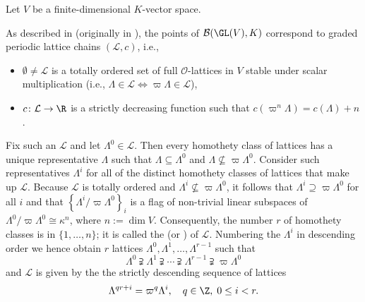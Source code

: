 \documentclass[a4paper]{scrartcl} %
\numberwithin{equation}{section}
\begin{document}
\begin{Remark}\label{gl-building}
  Let $V$ be a finite-dimensional $K$-vector space.
  
  As described in \cite[.9]{kisin-pappas} (originally in \cite{zbMATH03900941}), the points of $\mathcal{B}(\GL(V),K)$ correspond to graded periodic lattice chains $(\mathcal{L},c)$, i.e.,
\begin{itemize}
\item $\emptyset\ne\mathcal{L}$ is a totally ordered set of full $\mathcal{O}$-lattices in $V$ stable under scalar multiplication (i.e., $\Lambda\in\mathcal{L} \iff \varpi\Lambda\in\mathcal{L}$),
\item $c\colon \mathcal{L}\to\R$ is a strictly decreasing function such that $c(\varpi^n\Lambda)=c(\Lambda)+n$.
\end{itemize}
\end{Remark}

\begin{Remark}\label{gitterketten-nummerieren}
  Fix such an $\mathcal{L}$ and let $\Lambda^0\in\mathcal{L}$. Then every homothety class of lattices has a unique representative $\Lambda$ such that $\Lambda\subseteq\Lambda^0$ and $\Lambda\not\subseteq \varpi\Lambda^0$. Consider such representatives $\Lambda^i$ for all of the distinct homothety classes of lattices that make up $\mathcal{L}$. Because $\mathcal{L}$ is totally ordered and $\Lambda^i\not\subseteq \varpi\Lambda^0$, it follows that $\Lambda^i\supseteq \varpi\Lambda^0$ for all $i$ and that $\left\{\Lambda^i/\varpi\Lambda^0\right\}_i$ is a flag of non-trivial linear subspaces of $\Lambda^0/\varpi\Lambda^0\cong\kappa^{n}$, where $n:=\dim V$. Consequently, the number $r$ of homothety classes is in $\{1,\dotsc,n\}$; it is called the  (or ) of $\mathcal{L}$. Numbering the $\Lambda^i$ in descending order we hence obtain $r$ lattices $\Lambda^0,\Lambda^1,\dotsc,\Lambda^{r-1}$ such that
  \begin{equation}\label{eq:numbered-lattice-chain}
    \Lambda^0 \supsetneqq \Lambda^1 \supsetneqq \dotsb\supsetneqq \Lambda^{r-1} \supsetneqq \varpi\Lambda^0
  \end{equation}
  and $\mathcal{L}$ is given by the the strictly descending sequence of lattices
  \begin{equation*}
    \Lambda^{qr+i}=\varpi^q\Lambda^i,\quad q\in\Z, \; 0\leq i < r.
  \end{equation*}
\end{Remark}
\end{document}
